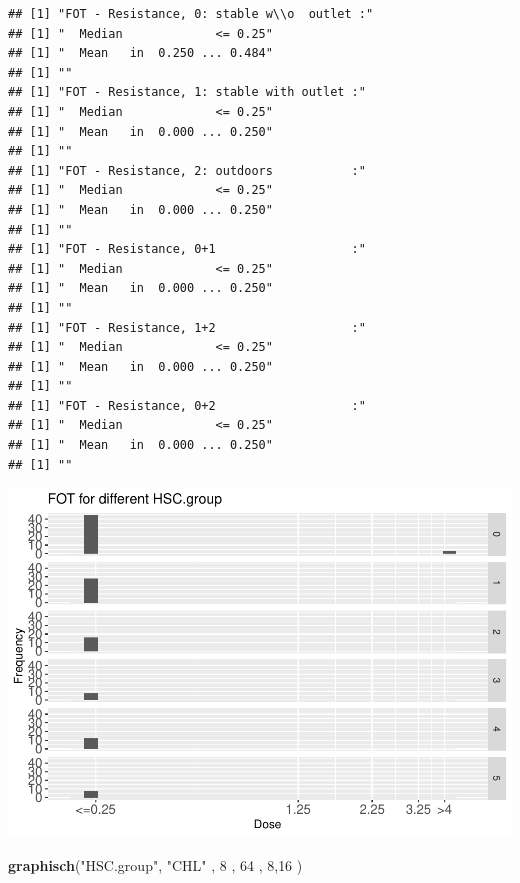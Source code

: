 \documentclass[
]{article}
\newenvironment{Shaded}{\begin{snugshade}}{\end{snugshade}}
\newcommand{\DecValTok}[1]{\textcolor[rgb]{0.00,0.00,0.81}{#1}}
\newcommand{\KeywordTok}[1]{\textcolor[rgb]{0.13,0.29,0.53}{\textbf{#1}}}
\newcommand{\NormalTok}[1]{#1}
\newcommand{\StringTok}[1]{\textcolor[rgb]{0.31,0.60,0.02}{#1}}
\begin{document}
\begin{verbatim}
## [1] "FOT - Resistance, 0: stable w\\o  outlet :"
## [1] "  Median             <= 0.25"
## [1] "  Mean   in  0.250 ... 0.484"
## [1] ""
## [1] "FOT - Resistance, 1: stable with outlet :"
## [1] "  Median             <= 0.25"
## [1] "  Mean   in  0.000 ... 0.250"
## [1] ""
## [1] "FOT - Resistance, 2: outdoors           :"
## [1] "  Median             <= 0.25"
## [1] "  Mean   in  0.000 ... 0.250"
## [1] ""
## [1] "FOT - Resistance, 0+1                   :"
## [1] "  Median             <= 0.25"
## [1] "  Mean   in  0.000 ... 0.250"
## [1] ""
## [1] "FOT - Resistance, 1+2                   :"
## [1] "  Median             <= 0.25"
## [1] "  Mean   in  0.000 ... 0.250"
## [1] ""
## [1] "FOT - Resistance, 0+2                   :"
## [1] "  Median             <= 0.25"
## [1] "  Mean   in  0.000 ... 0.250"
## [1] ""
\end{verbatim}

\includegraphics{Verteilungen_files/figure-latex/unnamed-chunk-51-1.pdf}

\begin{Shaded}
\begin{Highlighting}[]
   \KeywordTok{graphisch}\NormalTok{(}\StringTok{"HSC.group"}\NormalTok{, }\StringTok{"CHL"}\NormalTok{ , }\DecValTok{8}\NormalTok{    ,  }\DecValTok{64}\NormalTok{   ,   }\DecValTok{8}\NormalTok{,}\DecValTok{16}\NormalTok{   ) }
\end{Highlighting}
\end{Shaded}
\end{document}
